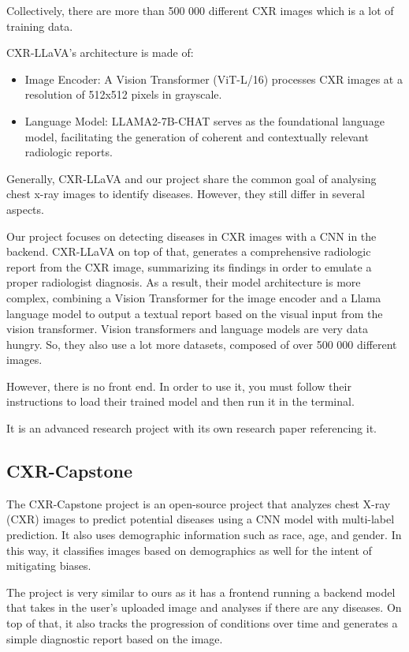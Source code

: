 \documentclass[12pt, titlepage]{article}
\begin{document}
Collectively, there are more than 500 000 different CXR images which is a lot of training data.

CXR-LLaVA's architecture is made of:
\begin{itemize}
\item Image Encoder: A Vision Transformer (ViT-L/16) processes CXR images at a resolution of 512x512 pixels in grayscale.
\item Language Model: LLAMA2-7B-CHAT serves as the foundational language model, facilitating the generation of coherent and contextually relevant radiologic reports.
\end{itemize}

Generally, CXR-LLaVA and our project share the common goal of analysing chest x-ray images to identify diseases. However, they still differ in several aspects.

Our project focuses on detecting diseases in CXR images with a CNN in the backend. CXR-LLaVA on top of that, generates a comprehensive radiologic report from the CXR image, summarizing its findings in order to emulate a proper radiologist diagnosis. As a result, their model architecture is more complex, combining a Vision Transformer for the image encoder and a Llama language model to output a textual report based on the visual input from the vision transformer. Vision transformers and language models are very data hungry. So, they also use a lot more datasets, composed of over 500 000 different images.

However, there is no front end. In order to use it, you must follow their instructions to load their trained model and then run it in the terminal.

It is an advanced research project with its own research paper referencing it.

\subsection{CXR-Capstone}
The CXR-Capstone project is an open-source project that analyzes chest X-ray (CXR) images to predict potential diseases using a CNN model with multi-label prediction. It also uses demographic information such as race, age, and gender. In this way, it classifies images based on demographics as well for the intent of mitigating biases.

The project is very similar to ours as it has a frontend running a backend model that takes in the user's uploaded image and analyses if there are any diseases. On top of that, it also tracks the progression of conditions over time and generates a simple diagnostic report based on the image.
\end{document}
